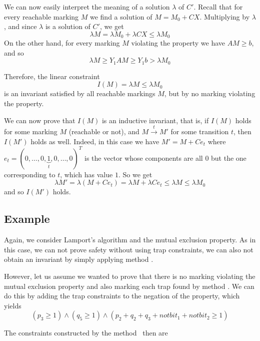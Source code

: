 We can now easily interpret the meaning of a solution $\lambda$ of $C'$. Recall that
for every reachable marking $M$ we find a solution of 
$M = M_0 + CX$. Multiplying by $\lambda$, and since $\lambda$ is a solution
of $C'$, we get 
$$\lambda M = \lambda M_0 + \lambda CX \leq \lambda M_0$$
\noindent On the other hand, for every marking $M$ violating the property
we have $ AM \geq b$, and so
$$\lambda M \geq Y_1 AM \geq Y_1 b > \lambda M_0$$

Therefore, the linear constraint
$$I(M) = \lambda M \leq \lambda M_0$$
is an invariant satisfied by all reachable markings $M$, 
but by no marking violating the property.

We can now prove that $I(M)$ is an inductive invariant, that is, if
$I(M)$ holds for some marking $M$ (reachable or not), and $M \xrightarrow{t} M'$
for some transition $t$, then $I(M')$ holds as well.
Indeed, in this case we have $M' = M + C e_t$ where $e_t = (0,\ldots,0,\underbrace{1}_{t},0,\ldots,0)^T$ is the vector whose components are all $0$ but the one
corresponding to $t$, which has value $1$. So we get
$$\lambda M' = \lambda(M + Ce_t) = \lambda M + \lambda Ce_t
\le \lambda M \le \lambda M_0$$
\noindent and so $I(M')$ holds.

\subsection{Example}

Again, we consider Lamport's algorithm and the mutual
exclusion property.  As in this case, we can not prove safety 
without using trap constraints, we can also
not obtain an invariant by simply applying method \invariant.

However, let us assume we wanted to prove that there is no marking
violating the mutual exclusion property and also marking each trap
found by method \safetyref. We can do this by adding
the trap constraints to the negation of the property, which yields
$$(p_3 \ge 1) \land (q_5 \ge 1) \land
(p_2 + q_2 + q_3 + notbit_1 + notbit_2 \ge 1)$$

The constraints constructed by the method \invariant\ then are

